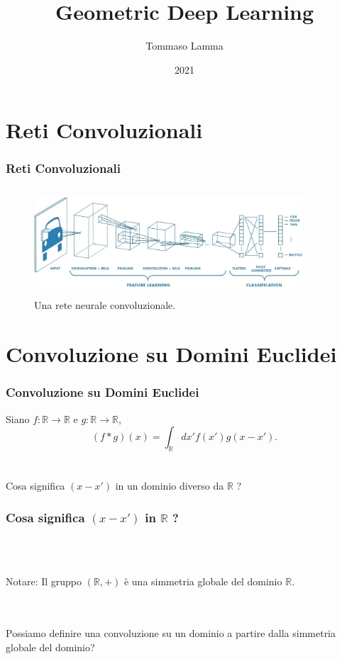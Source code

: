 \documentclass[xcolor=dvipsnames]{beamer}
\title{Geometric Deep Learning}
\author{Tommaso Lamma}
\date{2021}
\newcommand{\R}{\mathbb{R}}
\begin{document}
\frame{\titlepage}

\frame{\tableofcontents}

\section{Reti Convoluzionali}

\begin{frame}
    \frametitle{Reti Convoluzionali}
    \begin{figure}[H]
        \centering
        \includegraphics[width=10cm, height=4cm]{cnn}
        \caption{Una rete neurale convoluzionale.}
    \end{figure}       
\end{frame}

\section{Convoluzione su Domini Euclidei}

\begin{frame}
    \frametitle{Convoluzione su Domini Euclidei}    
    Siano $f:\R \to \R$ e $g:\R \to \R$,
    \[ (f * g)(x) = \int_{\R} dx' f(x')g(x-x'). \]
    \hfill \\
    \hfill \\
    { \large Cosa significa $(x - x')$ in un dominio diverso da $\R$ ?}
\end{frame}

\begin{frame}
    \frametitle{ \large Cosa significa $(x - x')$ \textbf{in} $\R$ ?}
    \hfill \\
    \hfill \\
    \begin{block}{Notare:}
        Il gruppo $(\R, +)$ è una simmetria globale del dominio $\R$.  
    \end{block}
    \hfill \\
    \hfill \\
    {\large Possiamo definire una convoluzione su un dominio a partire dalla simmetria globale del dominio?}
\end{frame}
\end{document}
